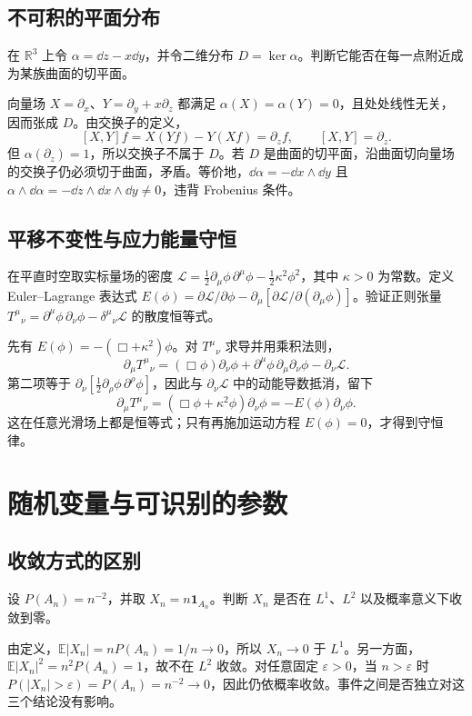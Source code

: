 \subsection*{不可积的平面分布}
在 \(\mathbb R^3\) 上令 \(\alpha=\dd z-x\dd y\)，并令二维分布 \(D=\ker\alpha\)。判断它能否在每一点附近成为某族曲面的切平面。

向量场 \(X=\partial_x\)、\(Y=\partial_y+x\partial_z\) 都满足 \(\alpha(X)=\alpha(Y)=0\)，且处处线性无关，因而张成 \(D\)。由交换子的定义，
\[
[X,Y]f=X(Yf)-Y(Xf)=\partial_z f,\qquad [X,Y]=\partial_z.
\]
但 \(\alpha(\partial_z)=1\)，所以交换子不属于 \(D\)。若 \(D\) 是曲面的切平面，沿曲面切向量场的交换子仍必须切于曲面，矛盾。等价地，\(\dd\alpha=-\dd x\wedge\dd y\) 且 \(\alpha\wedge\dd\alpha=-\dd z\wedge\dd x\wedge\dd y\ne0\)，违背 Frobenius 条件。

\subsection*{平移不变性与应力能量守恒}
在平直时空取实标量场的密度 \(\mathcal L=\tfrac12\partial_\mu\phi\,\partial^\mu\phi-\tfrac12\kappa^2\phi^2\)，其中 \(\kappa>0\) 为常数。定义 Euler--Lagrange 表达式 \(E(\phi)=\partial\mathcal L/\partial\phi-\partial_\mu[\partial\mathcal L/\partial(\partial_\mu\phi)]\)。验证正则张量 \(T^\mu{}_\nu=\partial^\mu\phi\,\partial_\nu\phi-\delta^\mu{}_\nu\mathcal L\) 的散度恒等式。

先有 \(E(\phi)=-(\Box+\kappa^2)\phi\)。对 \(T^\mu{}_\nu\) 求导并用乘积法则，
\[
\partial_\mu T^\mu{}_\nu
=(\Box\phi)\partial_\nu\phi
+\partial^\mu\phi\,\partial_\mu\partial_\nu\phi
-\partial_\nu\mathcal L.
\]
第二项等于 \(\partial_\nu[\tfrac12\partial_\rho\phi\,\partial^\rho\phi]\)，因此与 \(\partial_\nu\mathcal L\) 中的动能导数抵消，留下
\[
\partial_\mu T^\mu{}_\nu
=(\Box\phi+\kappa^2\phi)\partial_\nu\phi
=-E(\phi)\partial_\nu\phi.
\]
这在任意光滑场上都是恒等式；只有再施加运动方程 \(E(\phi)=0\)，才得到守恒律。

\section{随机变量与可识别的参数}

\subsection*{收敛方式的区别}
设 \(P(A_n)=n^{-2}\)，并取 \(X_n=n\mathbf1_{A_n}\)。判断 \(X_n\) 是否在 \(L^1\)、\(L^2\) 以及概率意义下收敛到零。

由定义，\(\mathbb E|X_n|=nP(A_n)=1/n\to0\)，所以 \(X_n\to0\) 于 \(L^1\)。另一方面，\(\mathbb E|X_n|^2=n^2P(A_n)=1\)，故不在 \(L^2\) 收敛。对任意固定 \(\varepsilon>0\)，当 \(n>\varepsilon\) 时 \(P(|X_n|>\varepsilon)=P(A_n)=n^{-2}\to0\)，因此仍依概率收敛。事件之间是否独立对这三个结论没有影响。

